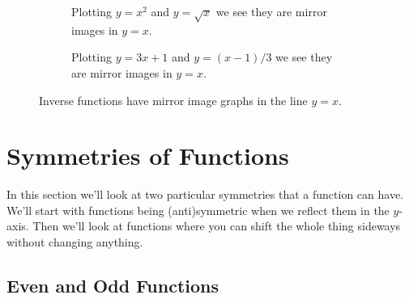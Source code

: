 \documentclass[fleqn]{LectureClass/LectureClass}
\begin{document}
    \begin{figure}
        \centering
        \begin{subfigure}{0.45\textwidth}
            \centering
            \caption{Plotting \(y = x^2\) and \(y = \sqrt{x}\) we see they are mirror images in \(y = x\).}
        \end{subfigure}
        \begin{subfigure}{0.45\textwidth}
            \centering
            \caption{Plotting \(y = 3x + 1\) and \(y = (x - 1)/3\) we see they are mirror images in \(y = x\).}
        \end{subfigure}
        \caption{Inverse functions have mirror image graphs in the line \(y = x\).}
    \end{figure}
    
    \chapter{Symmetries of Functions}
    In this section we'll look at two particular symmetries that a function can have.
    We'll start with functions being (anti)symmetric when we reflect them in the \(y\)-axis.
    Then we'll look at functions where you can shift the whole thing sideways without changing anything.
    
    \section{Even and Odd Functions}
\end{document}
